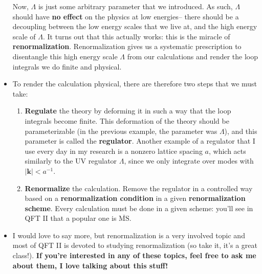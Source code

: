 \documentclass[12pt, oneside]{article}   	%
\theoremstyle{definition}
\begin{document}
\begin{itemize}
	Now, $\Lambda$ is just some arbitrary parameter that we introduced. As such, $\Lambda$ should have \textbf{no effect} on the physics at low energies-- there should be a decoupling between the low energy scales that we live at, and the high energy scale of $\Lambda$. It turns out that this actually works: this is the miracle of \textbf{renormalization}. Renormalization gives us a systematic prescription to disentangle this high energy scale $\Lambda$ from our calculations and render the loop integrals we do finite and physical. 
	
	\item To render the calculation physical, there are therefore two steps that we must take:
	\begin{enumerate}
		\item \textbf{Regulate} the theory by deforming it in such a way that the loop integrals become finite. This deformation of the theory should be parameterizable (in the previous example, the parameter was $\Lambda$), and this parameter is called the \textbf{regulator}. Another example of a regulator that I use every day in my research is a nonzero lattice spacing $a$, which acts similarly to the UV regulator $\Lambda$, since we only integrate over modes with $|\bm k| < a^{-1}$. 
		\item \textbf{Renormalize} the calculation. Remove the regulator in a controlled way based on a \textbf{renormalization condition} in a given \textbf{renormalization scheme}. Every calculation must be done in a given scheme: you'll see in QFT II that a popular one is $\overline{\mathrm{MS}}$. 
	\end{enumerate}
	
	\item I would love to say more, but renormalization is a very involved topic and most of QFT II is devoted to studying renormalization (so take it, it's a great class!). \textbf{If you're interested in any of these topics, feel free to ask me about them, I love talking about this stuff!}
	
\end{itemize}
\end{document}
